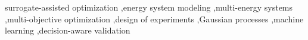 \begin{keyword}
surrogate-assisted optimization \sep energy system modeling \sep multi-energy systems \sep multi-objective optimization \sep design of experiments \sep Gaussian processes \sep machine learning \sep decision-aware validation
\end{keyword}
